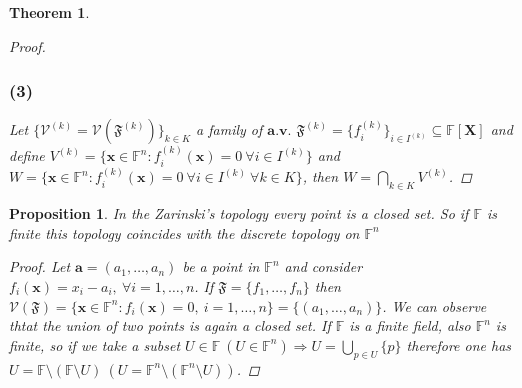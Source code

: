 \documentclass{article}
\newtheorem{proposition}{Proposition}
\newtheorem{theorem}{Theorem}
\begin{document}
\begin{theorem}
\begin{proof}
                \subsubsection*{(3)}
                    Let $\{ \mathcal{V}^{(k)} = \mathcal{V}(\mathfrak{F}^{(k)}) \}_{k \in K}$ a family of $\textbf{a.v.}$ $\mathfrak{F}^{(k)} = \{ f_i^{(k)}\}_{i \in I^{(k)}} \subseteq \mathbb{F}[\textbf{X}]$ and define
                    $V^{(k)} = \{ \textbf{x} \in \mathbb{F}^n : f_i^{(k)}(\textbf{x}) = 0 \ \forall i \in I^{(k)}\}$ and  $W = \{ \textbf{x} \in \mathbb{F}^n : f_i^{(k)}(\textbf{x}) = 0 \ \forall i \in I^{(k)} \ \forall k \in K \}$, then $W = \bigcap_{k\in K} V^{(k)}$. 
            \end{proof} 
        \end{theorem}
        \begin{proposition}
            In the Zarinski's topology every point is a closed set. So if $\mathbb{F}$ is finite this topology coincides with the discrete topology on $\mathbb{F}^n$
            \begin{proof}
                Let $\textbf{a} = (a_1,\dots,a_n)$ be a point in $\mathbb{F}^n $ and consider $f_i(\textbf{x}) = x_i - a_i, \ \forall i=1,\dots,n$. If $\mathfrak{F} = \{ f_1,\dots,f_n \}$ then $\mathcal{V}(\mathfrak{F}) = \{ \textbf{x} \in \mathbb{F}^n : f_i(\textbf{x}) = 0, \ i=1,\dots,n\} = \{ (a_1,\dots,a_n) \}$. We can observe thtat the union of two points is again a closed set.
                If $\mathbb{F}$ is a finite field, also $\mathbb{F}^n$ is finite, so if we take a subset $U \in \mathbb{F} \ (U \in \mathbb{F}^n) \Rightarrow U = \bigcup_{p \in U}\{ p\}$ therefore one has $U = \mathbb{F}\setminus (\mathbb{F}\setminus U) \ (U = \mathbb{F}^n\setminus (\mathbb{F}^n\setminus U))$.
            \end{proof}
        \end{proposition} 
        \newpage 
\end{document}

